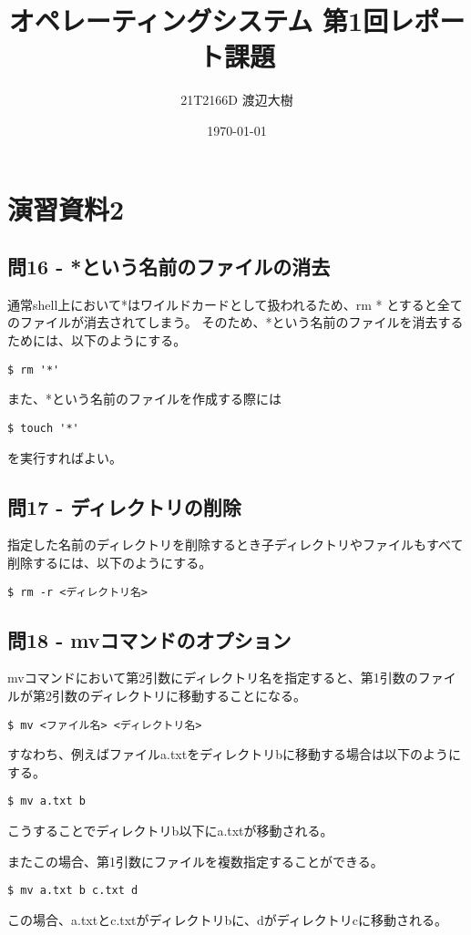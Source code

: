 \documentclass[a4paper,11pt]{jsarticle}
\begin{document}
\title{オペレーティングシステム 第1回レポート課題}
\author{21T2166D 渡辺大樹}
\date{\today}
\maketitle

\section*{演習資料2}
\subsection*{問16 - *という名前のファイルの消去}
通常shell上において*はワイルドカードとして扱われるため、rm * とすると全てのファイルが消去されてしまう。
そのため、*という名前のファイルを消去するためには、以下のようにする。
\begin{lstlisting}[caption=問16の解答]
$ rm '*'
\end{lstlisting}
また、*という名前のファイルを作成する際には
\begin{lstlisting}[caption=問16の解答]
$ touch '*'
\end{lstlisting}
を実行すればよい。

\subsection*{問17 - ディレクトリの削除}
指定した名前のディレクトリを削除するとき子ディレクトリやファイルもすべて削除するには、以下のようにする。
\begin{lstlisting}[caption=問17の解答]
$ rm -r <ディレクトリ名>
\end{lstlisting}

\subsection*{問18 - mvコマンドのオプション}
mvコマンドにおいて第2引数にディレクトリ名を指定すると、第1引数のファイルが第2引数のディレクトリに移動することになる。
\begin{lstlisting}[caption=問18の解答]
$ mv <ファイル名> <ディレクトリ名>
\end{lstlisting}
すなわち、例えばファイルa.txtをディレクトリbに移動する場合は以下のようにする。
\begin{lstlisting}[caption=問18の解答]
$ mv a.txt b
\end{lstlisting}
こうすることでディレクトリb以下にa.txtが移動される。

またこの場合、第1引数にファイルを複数指定することができる。
\begin{lstlisting}[caption=問18の解答]
    $ mv a.txt b c.txt d
\end{lstlisting}
この場合、a.txtとc.txtがディレクトリbに、dがディレクトリcに移動される。
\end{document}
